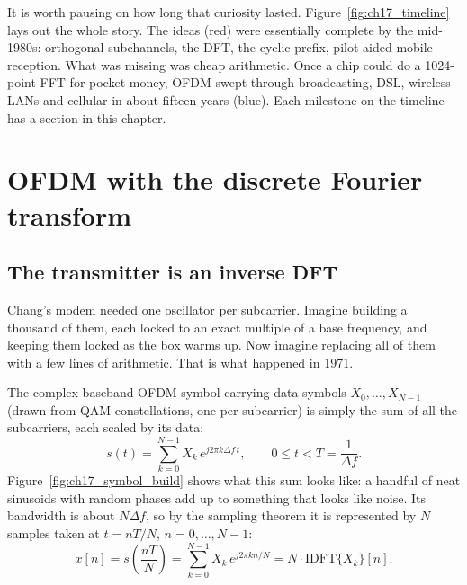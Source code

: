 It is worth pausing on how long that curiosity lasted. Figure~\ref{fig:ch17_timeline} lays out the
whole story. The ideas (red) were essentially complete by the mid-1980s: orthogonal subchannels,
the DFT, the cyclic prefix, pilot-aided mobile reception. What was missing was cheap arithmetic.
Once a chip could do a 1024-point FFT for pocket money, OFDM swept through broadcasting, DSL,
wireless LANs and cellular in about fifteen years (blue). Each milestone on the timeline has a
section in this chapter.

\section{OFDM with the discrete Fourier transform}
\label{sec:ch17:dft}

\subsection{The transmitter is an inverse DFT}

Chang's modem needed one oscillator per subcarrier. Imagine building a thousand of them, each
locked to an exact multiple of a base frequency, and keeping them locked as the box warms up. Now
imagine replacing all of them with a few lines of arithmetic. That is what happened in 1971.


The complex baseband OFDM symbol carrying data symbols $X_0,\dots,X_{N-1}$ (drawn from QAM
constellations, one per subcarrier) is simply the sum of all the subcarriers, each scaled by its
data:
\begin{equation}
s(t)=\sum_{k=0}^{N-1}X_k\,e^{j2\pi k\Delta f\,t},\qquad 0\le t<T=\frac1{\Delta f}.
\label{eq:ch17:ofdmct}
\end{equation}
Figure~\ref{fig:ch17_symbol_build} shows what this sum looks like: a handful of neat sinusoids
with random phases add up to something that looks like noise. Its bandwidth is about $N\Delta f$,
so by the sampling theorem it is represented by $N$ samples taken at $t=nT/N$, $n=0,\dots,N-1$:
\begin{equation}
x[n]=s\!\left(\frac{nT}{N}\right)=\sum_{k=0}^{N-1}X_k\,e^{j2\pi kn/N}=N\cdot\mathrm{IDFT}\{X_k\}[n].
\label{eq:ch17:idft}
\end{equation}

